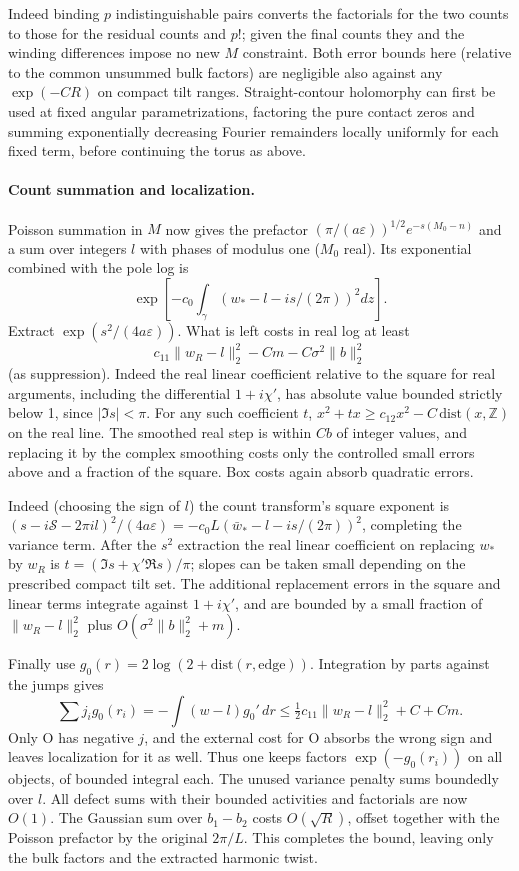 Indeed binding \(p\) indistinguishable pairs converts the factorials for the two counts to those for the residual counts and \(p!\); given the final counts they and the winding differences impose no new \(M\) constraint. Both error bounds here (relative to the common unsummed bulk factors) are negligible also against any \(\exp(-C R)\) on compact tilt ranges. Straight-contour holomorphy can first be used at fixed angular parametrizations, factoring the pure contact zeros and summing exponentially decreasing Fourier remainders locally uniformly for each fixed term, before continuing the torus as above.

\paragraph{Count summation and localization.}
Poisson summation in \(M\) now gives the prefactor \((\pi/(a\varepsilon))^{1/2}e^{-s(M_0-n)}\) and a sum over integers \(l\) with phases of modulus one (\(M_0\) real). Its exponential combined with the pole log is
\[
 \exp\left[-c_0\int_\gamma(w_*-l-is/(2\pi))^2 dz\right].
\]
Extract \(\exp(s^2/(4a\varepsilon))\). What is left costs in real log at least
\[
 c_{11}\|w_R-l\|_2^2-C m-C\sigma^2\|b\|_2^2
\]
(as suppression). Indeed the real linear coefficient relative to the square for real arguments, including the differential \(1+i\chi'\), has absolute value bounded strictly below 1, since \(|\Im s|<\pi\). For any such coefficient \(t\), \(x^2+t x\ge c_{12}x^2-C\,\mathrm{dist}(x,\mathbb Z)\) on the real line. The smoothed real step is within \(Cb\) of integer values, and replacing it by the complex smoothing costs only the controlled small errors above and a fraction of the square. Box costs again absorb quadratic errors.

Indeed (choosing the sign of \(l\)) the count transform's square exponent is \((s-i\mathcal S-2\pi i l)^2/(4a\varepsilon)=-c_0L(\bar w_*-l-is/(2\pi))^2\), completing the variance term. After the \(s^2\) extraction the real linear coefficient on replacing \(w_*\) by \(w_R\) is \(t=(\Im s+\chi'\Re s)/\pi\); slopes can be taken small depending on the prescribed compact tilt set. The additional replacement errors in the square and linear terms integrate against \(1+i\chi'\), and are bounded by a small fraction of \(\|w_R-l\|_2^2\) plus \(O(\sigma^2\|b\|_2^2+m)\).

Finally use \(g_0(r)=2\log(2+\mathrm{dist}(r,\mathrm{edge}))\). Integration by parts against the jumps gives
\[
 \sum j_i g_0(r_i)=-\int(w-l)g_0'\,dr
 \le\tfrac12 c_{11}\|w_R-l\|_2^2+C+C m .
\]
Only O has negative \(j\), and the external cost for O absorbs the wrong sign and leaves localization for it as well. Thus one keeps factors \(\exp(-g_0(r_i))\) on all objects, of bounded integral each. The unused variance penalty sums boundedly over \(l\). All defect sums with their bounded activities and factorials are now \(O(1)\). The Gaussian sum over \(b_1-b_2\) costs \(O(\sqrt R)\), offset together with the Poisson prefactor by the original \(2\pi/L\). This completes the bound, leaving only the bulk factors and the extracted harmonic twist.

